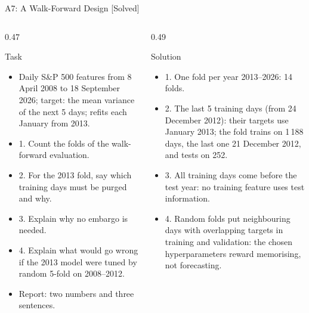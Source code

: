 \begin{frame}{A7: A Walk-Forward Design [Solved]}
\itemsize{\scriptsize}
\begin{columns}[T]
\begin{column}{0.47\textwidth}
\begin{block}{Task}
\begin{itemize}
    \item Daily S\&P 500 features from 8 April 2008 to 18 September 2026; target: the mean variance of the next 5 days; refits each January from 2013.
    \item 1. Count the folds of the walk-forward evaluation.
    \item 2. For the 2013 fold, say which training days must be purged and why.
    \item 3. Explain why no embargo is needed.
    \item 4. Explain what would go wrong if the 2013 model were tuned by random 5-fold on 2008--2012.
    \item Report: two numbers and three sentences.
\end{itemize}
\end{block}
\end{column}
\begin{column}{0.49\textwidth}
\begin{exampleblock}{Solution}
\begin{itemize}
    \item 1. One fold per year 2013--2026: 14 folds.
    \item 2. The last 5 training days (from 24 December 2012): their targets use January 2013; the fold trains on 1\,188 days, the last one 21 December 2012, and tests on 252.
    \item 3. All training days come before the test year: no training feature uses test information.
    \item 4. Random folds put neighbouring days with overlapping targets in training and validation: the chosen hyperparameters reward memorising, not forecasting.
\end{itemize}
\end{exampleblock}
\end{column}
\end{columns}
\end{frame}

